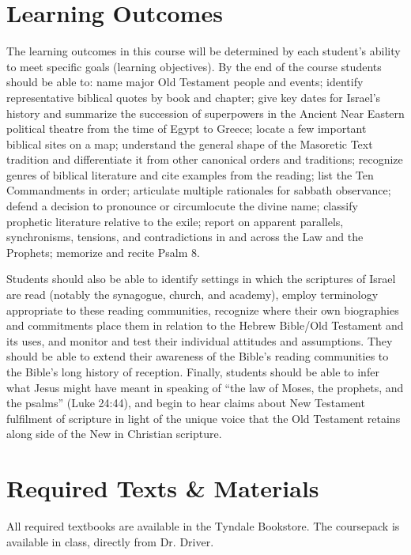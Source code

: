 \documentclass[titlepage]{article}
\newcommand\incl{../includes}
\begin{document}


\section{Learning Outcomes}
\label{outcomes}

The learning outcomes in this course will be determined by each
student's ability to meet specific goals (learning objectives). By the
end of the course students should be able to:
  name major Old Testament people and events;
  identify representative biblical quotes by book and chapter;
  give key dates for Israel's history and summarize the succession of superpowers in the Ancient Near Eastern political theatre from the time of Egypt to Greece;
  locate a few important biblical sites on a map;
  understand the general shape of the Masoretic Text tradition and differentiate it from other canonical orders and traditions;
  recognize genres of biblical literature and cite examples from the reading;
  list the Ten Commandments in order;
  articulate multiple rationales for sabbath observance;
  defend a decision to pronounce or circumlocute the divine name;
  classify prophetic literature relative to the exile;
  report on apparent parallels, synchronisms, tensions, and contradictions in and across the Law and the Prophets;
  memorize and recite Psalm 8.

Students should also be able to identify settings in which the
scriptures of Israel are read (notably the synagogue, church, and
academy), employ terminology appropriate to these reading communities,
recognize where their own biographies and commitments place them in
relation to the Hebrew Bible/Old Testament and its uses, and monitor and
test their individual attitudes and assumptions. They should be able
to extend their awareness of the Bible's reading communities to the
Bible's long history of reception. Finally, students should be able to
infer what Jesus might have meant in speaking of ``the law of Moses, the
prophets, and the psalms'' (Luke 24:44), and begin to hear claims about
New Testament fulfilment of scripture in light of the unique voice that
the Old Testament retains along side of the New in Christian scripture.

\section{Required Texts \& Materials}
\label{texts}

All required textbooks are available in the Tyndale Bookstore. The
coursepack is available in class, directly from Dr. Driver.
\end{document}
